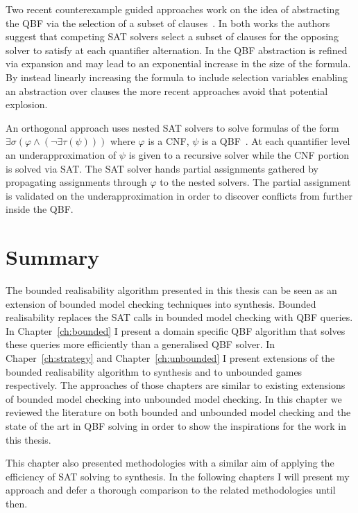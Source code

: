 Two recent counterexample guided approaches work on the idea of abstracting the QBF via the selection of a subset of clauses~\cite{Rabe15,Janota15}. In both works the authors suggest that competing SAT solvers select a subset of clauses for the opposing solver to satisfy at each quantifier alternation. In \cite{Janota12} the QBF abstraction is refined via expansion and may lead to an exponential increase in the size of the formula. By instead linearly increasing the formula to include selection variables enabling an abstraction over clauses the more recent approaches avoid that potential explosion.

An orthogonal approach uses nested SAT solvers to solve formulas of the form $\exists \sigma (\varphi \land (\lnot \exists \tau (\psi)))$ where $\varphi$ is a CNF, $\psi$ is a QBF~\cite{Bogaerts16}. At each quantifier level an underapproximation of $\psi$ is given to a recursive solver while the CNF portion is solved via SAT. The SAT solver hands partial assignments gathered by propagating assignments through $\varphi$ to the nested solvers. The partial assignment is validated on the underapproximation in order to discover conflicts from further inside the QBF. 

\section{Summary}

The bounded realisability algorithm presented in this thesis can be seen as an extension of bounded model checking techniques into synthesis. Bounded realisability replaces the SAT calls in bounded model checking with QBF queries. 
In Chapter~\ref{ch:bounded} I present a domain specific QBF algorithm that solves these queries more efficiently than a generalised QBF solver. In Chaper~\ref{ch:strategy} and Chapter~\ref{ch:unbounded} I present extensions of the bounded realisability algorithm to synthesis and to unbounded games respectively. The approaches of those chapters are similar to existing extensions of bounded model checking into unbounded model checking. In this chapter we reviewed the literature on both bounded and unbounded model checking and the state of the art in QBF solving in order to show the inspirations for the work in this thesis.

This chapter also presented methodologies with a similar aim of applying the efficiency of SAT solving to synthesis. In the following chapters I will present my approach and defer a thorough comparison to the related methodologies until then.
